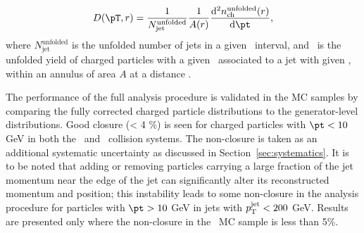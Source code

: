 \begin{align*}
   \Dptr = \frac{1}{N_\mathrm{jet}^\mathrm{unfolded}} \frac{1}{A(r)} \frac{\fd^2 \nchunf(r)}{\fd \pt},
 \end{align*}
where $N_\mathrm{jet}^\mathrm{unfolded}$ is the unfolded number of jets in a given \ptjet\ interval, and \nchunf\  is the unfolded yield of charged particles with a given \pt\ associated to a jet with given \ptjet, within an annulus of area $A$ at a distance \rvar.

The performance of the full analysis procedure is validated in the MC samples by comparing the fully corrected charged particle distributions to the generator-level distributions. Good closure (< 4 \%) is seen for charged particles with $\pt < 10$ GeV in both the \pp\ and \pbpb\ collision systems. The non-closure is taken as an additional systematic uncertainty as discussed in Section~\ref{sec:systematics}.
It is to be noted that adding or removing particles carrying a large fraction of the jet momentum near the edge of the jet can significantly alter its
reconstructed momentum and position; this instability leads to some non-closure in the analysis procedure for particles with $\pt > 10$ GeV in jets with $\mbox{$p_{\mathrm{T}}^{\mathrm{jet}}$} < 200$ GeV. 
Results are presented only where the non-closure in the \pp\ MC sample is less than 5\%.




